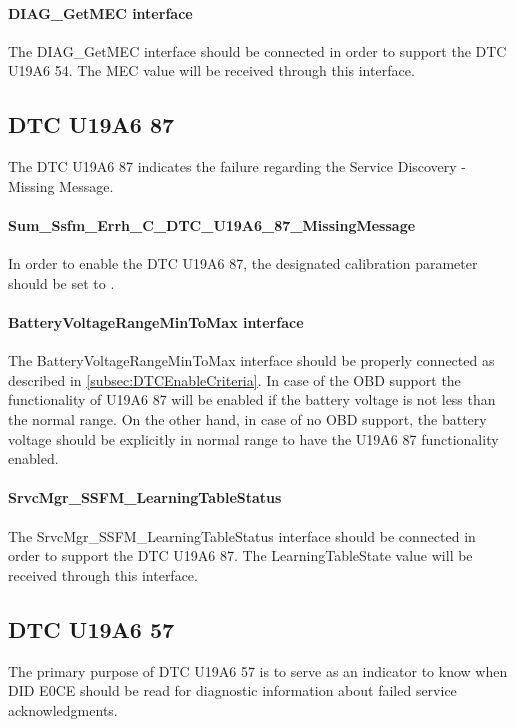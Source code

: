 \paragraph{DIAG\_GetMEC interface}
The DIAG\_GetMEC interface should be connected in order to support the DTC U19A6 54. The MEC value will be received through this interface.

\subsection{DTC U19A6 87}
\label{subsec:SSFMERRHDTCU19A687Handler}

The DTC U19A6 87 indicates the failure regarding the Service Discovery - Missing Message.

\paragraph{Sum\_Ssfm\_Errh\_C\_DTC\_U19A6\_87\_MissingMessage }
In order to enable the DTC U19A6 87, the designated calibration parameter should be set to .

\paragraph{BatteryVoltageRangeMinToMax interface}
The BatteryVoltageRangeMinToMax interface should be properly connected as described in \ref{subsec:DTCEnableCriteria}. In case of the OBD support the
functionality of U19A6 87 will be enabled if the battery voltage is not less than the normal range. On the other hand, in case of no OBD support, the
battery voltage should be explicitly in normal range to have the U19A6 87 functionality enabled.

\paragraph{SrvcMgr\_SSFM\_LearningTableStatus}
The SrvcMgr\_SSFM\_LearningTableStatus interface should be connected in order to support the DTC U19A6 87. The LearningTableState value will be received through this interface.

\subsection{DTC U19A6 57}
\label{subsec:U19A657Handler}

The primary purpose of DTC U19A6 57 is to serve as an indicator to know when DID E0CE should be read for diagnostic information about failed service acknowledgments.

